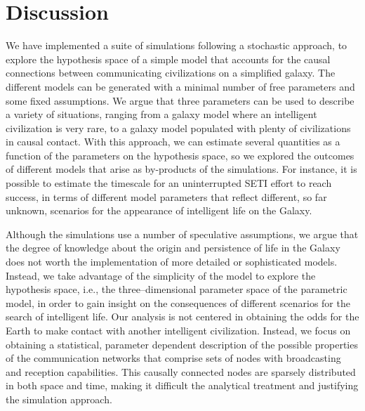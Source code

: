 \documentclass[crop]{CSLB}
\begin{document}




\section{Discussion}\label{S_discussion}

We have implemented a suite of simulations following a stochastic
approach, to explore the hypothesis space of a simple model that
accounts for the causal connections between communicating
civilizations on a simplified galaxy.
%
The different models can be generated with a minimal number of free
parameters and some fixed assumptions.
%
We argue that three parameters can be used to describe a variety of
situations, ranging from a galaxy model where an intelligent civilization is
very rare, to a galaxy model populated with plenty of civilizations in
causal contact.
%
With this approach, we can estimate several quantities as a function
of the parameters on the hypothesis space,
so we explored the outcomes of different models 
that arise as by-products of the simulations.
%
For instance, it is possible to estimate the timescale for an
uninterrupted SETI effort to reach success, in terms of different
model parameters that reflect different, so far unknown, scenarios for
the appearance of intelligent life on the Galaxy.






Although the simulations use a number of speculative assumptions, we
argue that the degree of knowledge about the origin and persistence of
life in the Galaxy does not worth the implementation of more detailed
or sophisticated models.
%
Instead, we take advantage of the simplicity of the model to explore
the hypothesis space, i.e., the three--dimensional parameter space of
the parametric model, in order to gain insight on the consequences of
different scenarios for the search of intelligent life.
%
Our analysis is not centered in obtaining the odds for the Earth
to make contact with another intelligent civilization.
%
Instead, we focus on obtaining a statistical, parameter dependent
description of the possible properties of the communication networks
that comprise sets of nodes with broadcasting and reception
capabilities.
%
This causally connected nodes are sparsely distributed in both space
and time, making it difficult the analytical treatment and justifying
the simulation approach.
\end{document}
